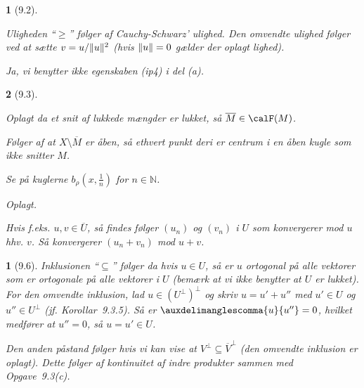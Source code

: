 \documentclass[a4paper, 11pt, article, danish, oneside]{memoir}
\title{\doctitle}
\author{\docauthor}
\newcommand{\naturals}{\mathbb{N}}
\newcommand{\blank}{\mathrel{\;\cdot\;}}
\newcommand{\blankifempty}[1]{\ifstrempty{#1}{\blank}{#1}}
\DeclarePairedDelimiter{\auxdelimlVert}{\lVert}{\rVert}
\newcommand{\norm}[1]{\auxdelimlVert{\blankifempty{#1}}}
\newcommand{\inner}[2]{\auxdelimanglescomma{\blankifempty{#1}}{\blankifempty{#2}}}
\newcommand{\pencilsymbol}{\raisebox{-2pt}{\normalfont\PencilLeft}}
\theoremstyle{changedotcustomnumber}
\newtheorem{opgave}{\pencilsymbol}
\theoremstyle{changedotbreakcustomnumber}
\newtheorem{opgavebreak}{\pencilsymbol}
\begin{document}
\maketitle



\begin{opgavebreak}[9.2]
\begin{solutionsec}
    \item Uligheden \enquote{$\geq$} følger af Cauchy-Schwarz' ulighed. Den omvendte ulighed følger ved at sætte $v = u/\norm{u}^2$ (hvis $\norm{u} = 0$ gælder der oplagt lighed).

    \item Ja, vi benytter ikke egenskaben (ip4) i del (a).
\end{solutionsec}
\end{opgavebreak}


\begin{opgavebreak}[9.3]
\begin{solutionsec}
    \item Oplagt da et snit af lukkede mængder er lukket, så $\overline{M} \in \calF(M)$.

    \item Følger af at $X \setminus \overline{M}$ er åben, så ethvert punkt deri er centrum i en åben kugle som ikke snitter $M$.

    \item Se på kuglerne $b_\rho(x,\tfrac{1}{n})$ for $n \in \naturals$.

    \item Oplagt.

    \item Hvis f.eks. $u,v \in \overline{U}$, så findes følger $(u_n)$ og $(v_n)$ i $U$ som konvergerer mod $u$ hhv. $v$. Så konvergerer $(u_n + v_n)$ mod $u + v$.
\end{solutionsec}
\end{opgavebreak}


\begin{opgave}[9.6]
    Inklusionen \enquote{$\subseteq$} følger da hvis $u \in U$, så er $u$ ortogonal på alle vektorer som er ortogonale på alle vektorer i $U$ (bemærk at vi ikke benytter at $U$ er lukket). For den omvendte inklusion, lad $u \in (U^\perp)^\perp$ og skriv $u = u' + u''$ med $u' \in U$ og $u'' \in U^\perp$ (jf. Korollar~9.3.5). Så er $\inner{u}{u''} = 0$, hvilket medfører at $u'' = 0$, så $u = u' \in U$.

    Den anden påstand følger hvis vi kan vise at $V^\perp \subseteq \overline{V}^\perp$ (den omvendte inklusion er oplagt). Dette følger af kontinuitet af indre produkter sammen med Opgave~9.3(c).
\end{opgave}
\end{document}
